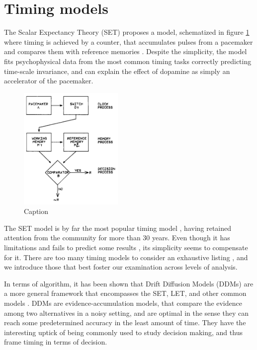     
\section{Timing models}
\label{sec:models}
    The Scalar Expectancy Theory (SET) proposes a model, schematized in figure \ref{fig:set_schema} where timing is achieved by a counter, that accumulates pulses from a pacemaker and compares them with reference memories \cite{}. Despite the simplicity, the model fits psychophysical data from the most common timing tasks \cite{} correctly predicting time-scale invariance, and can explain the effect of dopamine as simply an accelerator of the pacemaker.
    
    \begin{figure}
        \centering
        \includegraphics[width=5cm]{figures/SET_model_schema.png}
        \caption{Caption}
        \label{fig:set_schema}
    \end{figure}
    
    The SET model is by far the most popular timing model \cite{buhusi2005makes}, having retained attention from the community for more than 30 years. Even though it has limitations and fails to predict some results \cite{machado2009learning}, its simplicity seems to compensate for it. There are too many timing models to consider an exhaustive listing \cite{}, and we introduce those that best foster our examination across levels of analysis. 
    
    In terms of algorithm, it has been shown that Drift Diffusion Models (DDMs) are a more general framework that encompasses the SET, LET, and other common models \cite{balci2016decision}. DDMs are evidence-accumulation models, that compare the evidence among two alternatives in a noisy setting, and are optimal in the sense they can reach some predetermined accuracy in the least amount of time. They have the interesting uptick of being commonly used to study decision making, and thus frame timing in terms of decision. 
    
